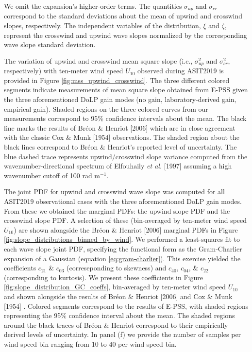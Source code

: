 \documentclass[letterpaper,journal]{IEEEtran}
\begin{document}
We omit the expansion's higher-order terms. The quantities $\sigma_{up}$ and $\sigma_{cr}$ correspond to the standard deviations about the mean of upwind and crosswind slopes, respectively. The independent variables of the distribution, $\xi$ and $\zeta$, represent the crosswind and upwind wave slopes normalized by the corresponding wave slope standard deviation.

The variation of upwind and crosswind mean square slope (i.e., $\sigma_{up}^2$ and $\sigma_{cr}^2$, respectively) with ten-meter wind speed $U_{10}$ observed during ASIT2019 is provided in Figure \ref{fig:mss_upwind_crosswind}. The three different colored segments indicate measurements of mean square slope obtained from E-PSS given the three aforementioned DoLP gain modes (no gain, laboratory-derived gain, empirical gain). Shaded regions on the three colored curves from our measurements correspond to 95\% confidence intervals about the mean. The black line marks the results of Br\'eon \& Henriot [2006] \cite{Breon2006} which are in close agreement with the classic Cox \& Munk [1954] \cite{Cox1954a} observations. The shaded region about the black lines correspond to Br\'eon \& Henriot's reported level of uncertainty. The blue dashed trace represents upwind/crosswind slope variance computed from the wavenumber-directional spectrum of Elfouhaily \emph{et al.} [1997] \cite{Elfouhaily1997} assuming a high wavenumber cutoff of 100 rad m$^{-1}$.

The joint PDF for upwind and crosswind wave slope was computed for all ASIT2019 observational cases with the three aforementioned DoLP gain modes. From these we obtained the marginal PDFs: the upwind slope PDF and the crosswind slope PDF. A selection of these (bin-averaged by ten-meter wind speed $U_{10}$) are shown alongside the Br\'eon \& Henriot [2006] \cite{Breon2006} marginal PDFs in Figure \ref{fig:slope_distributions_binned_by_wind}. We performed a least-squares fit to each wave slope joint PDF, specifying the functional form as the Gram-Charlier expansion of a Gaussian (equation \ref{eq:gram-charlier}). This exercise yielded the coefficients $c_{21}$ \& $c_{03}$ (correseponding to skewness) and $c_{40}$, $c_{04}$, \& $c_{22}$ (corresponding to kurtosis). We present these coefficients in Figure \ref{fig:slope_distribution_GC_coeffs}, bin-averaged by ten-meter wind speed $U_{10}$ and shown alongside the results of Br\'eon \& Henriot [2006] \cite{Breon2006} and Cox \& Munk [1954] \cite{Cox1954a}. Colored segments correspond to the results of E-PSS, with shaded regions representing the 95\% confidence interval about the mean. The shaded regions around the black traces of Br\'eon \& Henriot correspond to their empirically derived levels of uncertainty. In panel (f) we provide the number of samples per wind speed bin ranging from 10 to 40 per wind speed bin.
\end{document}
